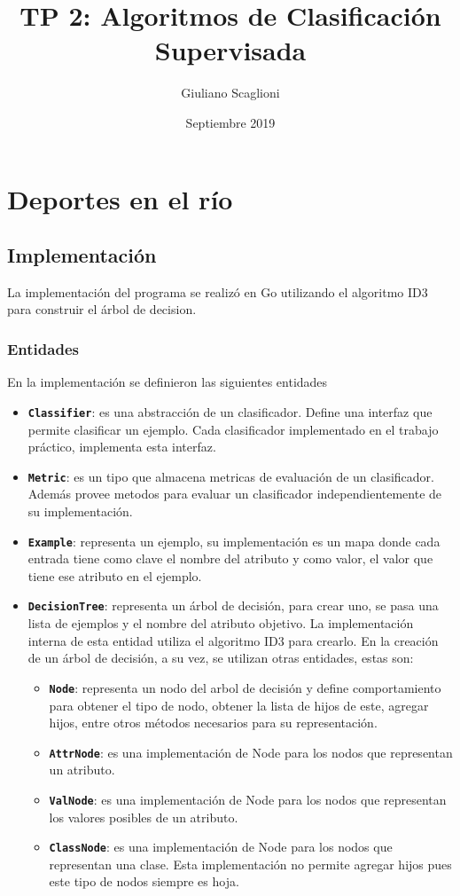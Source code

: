 \documentclass[a4paper]{article}
\title{TP 2: Algoritmos de Clasificación Supervisada}
\author{Giuliano Scaglioni}
\date{Septiembre 2019}
\newcommand{\bold}[1]{\textbf{\texttt{#1}}}
\begin{document}
\clearpage\maketitle
\thispagestyle{empty}

\newpage

\setcounter{page}{1}

\section{Deportes en el río}
  \subsection{Implementación}
  La implementación del programa se realizó en Go utilizando el algoritmo ID3 para construir el árbol de decision.

  \subsubsection{Entidades}
    En la implementación se definieron las siguientes entidades
    \begin{itemize}
      \item \bold{Classifier}: es una abstracción de un clasificador. Define una interfaz que permite clasificar un ejemplo. Cada clasificador implementado en el trabajo práctico, implementa esta interfaz.
      \item \bold{Metric}: es un tipo que almacena metricas de evaluación de un clasificador. Además provee metodos para evaluar un clasificador independientemente de su implementación.
      \item \bold{Example}: representa un ejemplo, su implementación es un mapa donde cada entrada tiene como clave el nombre del atributo y como valor, el valor que tiene ese atributo en el ejemplo.
      \item \bold{DecisionTree}: representa un árbol de decisión, para crear uno, se pasa una lista de ejemplos y el nombre del atributo objetivo. La implementación interna de esta entidad utiliza el algoritmo ID3 para crearlo. En la creación de un árbol de decisión, a su vez, se utilizan otras entidades, estas son:
      \begin{itemize}
        \item \bold{Node}: representa un nodo del arbol de decisión y define comportamiento para obtener el tipo de nodo, obtener la lista de hijos de este, agregar hijos, entre otros métodos necesarios para su representación.
        \item \bold{AttrNode}: es una implementación de Node para los nodos que representan un atributo.
        \item \bold{ValNode}: es una implementación de Node para los nodos que representan los valores posibles de un atributo.
        \item \bold{ClassNode}: es una implementación de Node para los nodos que representan una clase. Esta implementación no permite agregar hijos pues este tipo de nodos siempre es hoja.
      \end{itemize}
    \end{itemize}
\end{document}

